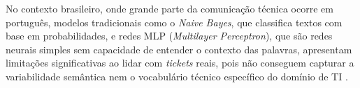 \documentclass[
    12pt,                %
    openright,           %
    oneside,             %
    a4paper,             %
    english,             %
    brazil               %
]{abntex2}
\begin{document}
No contexto brasileiro, onde grande parte da comunicação técnica 
ocorre em português, modelos tradicionais como o \textit{Naive 
Bayes}, que classifica textos com base em probabilidades, e redes 
MLP (\textit{Multilayer Perceptron}), que são redes neurais simples 
sem capacidade de entender o contexto das palavras, apresentam 
limitações significativas ao lidar com \textit{tickets} reais, 
pois não conseguem capturar a variabilidade semântica nem o 
vocabulário técnico específico do domínio de TI \cite{yokota2025}.

\vspace{0.3cm}






\end{document}
